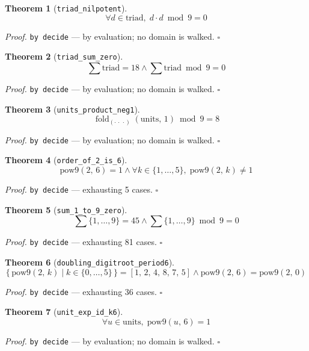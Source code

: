 \documentclass[11pt]{article}
\newtheorem{theorem}{Theorem}[section]
\begin{document}
\begin{theorem}[\texttt{triad\_nilpotent}]
\[ \forall d \in \mathrm{triad},\; d \cdot d \bmod 9 = 0 \]
\end{theorem}
\noindent\emph{Proof.} \texttt{by decide} --- by evaluation; no domain is walked. \hfill$\square$

\begin{theorem}[\texttt{triad\_sum\_zero}]
\[ \sum \mathrm{triad} = 18 \land \sum \mathrm{triad} \bmod 9 = 0 \]
\end{theorem}
\noindent\emph{Proof.} \texttt{by decide} --- by evaluation; no domain is walked. \hfill$\square$

\begin{theorem}[\texttt{units\_product\_neg1}]
\[ \operatorname{fold}_{(\cdot\,\cdot\,\cdot)}\left(\mathrm{units},\, 1\right) \bmod 9 = 8 \]
\end{theorem}
\noindent\emph{Proof.} \texttt{by decide} --- by evaluation; no domain is walked. \hfill$\square$

\begin{theorem}[\texttt{order\_of\_2\_is\_6}]
\[ \mathrm{pow9}\mathopen{}\left(2,\,6\right) = 1 \land \forall k \in \{1,\dots,5\},\; \mathrm{pow9}\mathopen{}\left(2,\,k\right) \neq 1 \]
\end{theorem}
\noindent\emph{Proof.} \texttt{by decide} --- exhausting 5 cases. \hfill$\square$

\begin{theorem}[\texttt{sum\_1\_to\_9\_zero}]
\[ \sum \{1,\dots,9\} = 45 \land \sum \{1,\dots,9\} \bmod 9 = 0 \]
\end{theorem}
\noindent\emph{Proof.} \texttt{by decide} --- exhausting 81 cases. \hfill$\square$

\begin{theorem}[\texttt{doubling\_digitroot\_period6}]
\[ \{\, \mathrm{pow9}\mathopen{}\left(2,\,k\right) \mid k \in \{0,\dots,5\} \,\} = [1,\,2,\,4,\,8,\,7,\,5] \land \mathrm{pow9}\mathopen{}\left(2,\,6\right) = \mathrm{pow9}\mathopen{}\left(2,\,0\right) \]
\end{theorem}
\noindent\emph{Proof.} \texttt{by decide} --- exhausting 36 cases. \hfill$\square$

\begin{theorem}[\texttt{unit\_exp\_id\_k6}]
\[ \forall u \in \mathrm{units},\; \mathrm{pow9}\mathopen{}\left(u,\,6\right) = 1 \]
\end{theorem}
\noindent\emph{Proof.} \texttt{by decide} --- by evaluation; no domain is walked. \hfill$\square$
\end{document}
